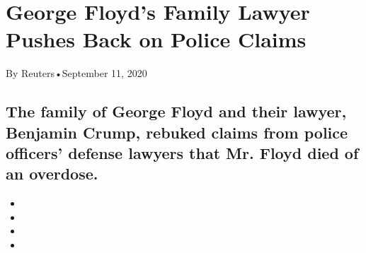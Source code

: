 \hypertarget{george-floyds-family-lawyer-pushes-back-on-police-claims-1}{%
\section{George Floyd's Family Lawyer Pushes Back on Police
Claims}\label{george-floyds-family-lawyer-pushes-back-on-police-claims-1}}

By Reuters•September 11, 2020

\hypertarget{the-family-of-george-floyd-and-their-lawyer-benjamin-crump-rebuked-claims-from-police-officers-defense-lawyers-that-mr-floyd-died-of-an-overdose-1}{%
\subsection{The family of George Floyd and their lawyer, Benjamin Crump,
rebuked claims from police officers' defense lawyers that Mr. Floyd died
of an
overdose.}\label{the-family-of-george-floyd-and-their-lawyer-benjamin-crump-rebuked-claims-from-police-officers-defense-lawyers-that-mr-floyd-died-of-an-overdose-1}}

\begin{itemize}
\item
\item
\item
\item
\end{itemize}

